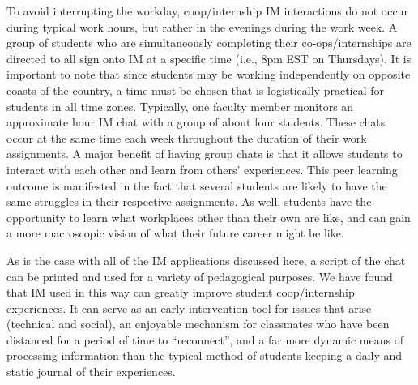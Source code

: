 \documentclass[11.5pt]{sig-alternate} %
\begin{document}
\begin{large}
To avoid interrupting the workday, coop/internship IM interactions do not occur during typical work hours, but rather in the evenings during the work week. A group of students who are simultaneously completing their co-ops/internships are directed to all sign onto IM at a specific time (i.e., 8pm EST on Thursdays). It is important to note that since students may be working independently on opposite coasts of the country, a time must be chosen that is logistically practical for students in all time zones. Typically, one faculty member monitors an approximate hour IM chat with a group of about four students. These chats occur at the same time each week throughout the duration of their work assignments. A major benefit of having group chats is that it allows students to interact with each other and learn from others’ experiences. This peer learning outcome is manifested in the fact that several students are likely to have the same struggles in their respective assignments. As well, students have the opportunity to learn what workplaces other than their own are like, and can gain a more macroscopic vision of what their future career might be like. 

As is the case with all of the IM applications discussed here, a script of the chat can be printed and used for a variety of pedagogical purposes. We have found that IM used in this way can greatly improve student coop/internship experiences. It can serve as an early intervention tool for issues that arise (technical and social), an enjoyable mechanism for classmates who have been distanced for a period of time to “reconnect”, and a far more dynamic means of processing information than the typical method of students keeping a daily and static journal of their experiences. 


\end{large}
\end{document}
